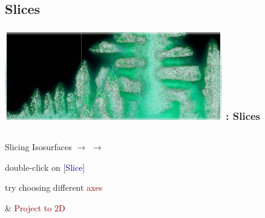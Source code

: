 \subsection{Slices}
\begin{frame}
\frametitle{\href{https://wci.llnl.gov/simulation/computer-codes/visit/}{\includegraphics[height=.85cm]{figs/visit-logos/VisIt-04}} \hspace{-.85cm}{\bf \textcolor{lightgray}{VisIt}}: Slices}
\begin{columns}
\begin{column}{8cm}
\begin{beamerboxesrounded}[upper=block head,lower=block body,shadow=true]{Slicing Isosurfaces}
	\textcolor{DarkBlue}{} 
			$\rightarrow$ 
			$\rightarrow$ \framebox{\bf \textcolor{DarkBlue}{Slice}}

	\textcolor{DarkBlue}{}
		double-click on [\textcolor{DarkBlue}{Slice}]

	\hspace{3.5mm}
		try choosing different \textcolor{DarkRed}{axes} 

		\hspace{7.75mm}
		\& \textcolor{DarkRed}{Project to 2D}


\end{beamerboxesrounded}
\end{column}
\end{columns}
\end{frame}
